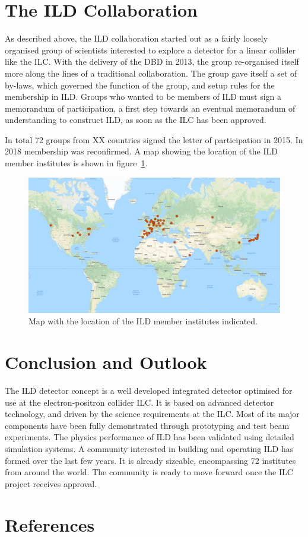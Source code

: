 \documentclass[%
 amsmath,amssymb,
 aps,
]{revtex4-1}
\begin{document}
\section{The ILD Collaboration}
As described above, the ILD collaboration started out as a fairly loosely organised group of scientists interested to explore a detector for a linear collider like the ILC. With the delivery of the DBD in 2013, the group re-organised itself more along the lines of a traditional collaboration. The group gave itself a set of by-laws, which governed the function of the group, and setup rules for the membership in ILD. Groups who wanted to be members of ILD must sign a memorandum of participation, a first step towards an eventual memorandum of understanding to construct ILD, as soon as the ILC has been approved. 

In total 72 groups from XX countries signed the letter of participation in 2015. In 2018 membership was reconfirmed. A map showing the location of the ILD member institutes is shown in figure~\ref{ild-fig-membermap}.

\begin{figure}
    \centering
    \includegraphics[width=0.6\hsize]{figures/ILD_members_map.pdf}
    \caption{Map with the location of the ILD member institutes indicated.}
    \label{ild-fig-membermap}
\end{figure}



\section{Conclusion and Outlook}
The ILD detector concept is a well developed integrated detector optimised for use at the electron-positron collider ILC. It is based on advanced detector technology, and driven by the science requirements at the ILC. Most of its major components have been fully demonstrated through prototyping and test beam experiments. The physics performance of ILD has been validated using detailed simulation systems. A community interested in building and operating ILD has formed over the last few years. It is already sizeable, encompassing 72 institutes from around the world. The community is ready to move forward once the ILC project receives approval. 

\section{References}


\end{document}
